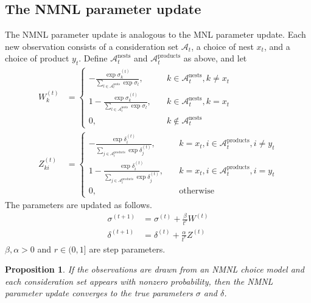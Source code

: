 \documentclass[preprint,12pt,authoryear]{elsarticle}
\newtheorem{proposition}{Proposition}
\begin{document}
\subsection{The NMNL parameter update}
The NMNL parameter update is analogous to the MNL parameter update. Each new observation consists of a consideration set $\mathcal{A}_t$, a choice of nest $x_t$, and a choice of product $y_t$. Define $\mathcal{A}_t^{\text{nests}}$ and $\mathcal{A}_{t}^{\text{products}}$ as above, and let
\begin{align}
W^{(t)}_k &= \begin{cases}
 -  \frac{\exp \sigma^{(t)}_k}{\sum_{l\in \mathcal{A}_{t}^{\text{nests}}} \exp \sigma_l}, \quad & k \in \mathcal{A}_{t}^{\text{nests}}, k \neq x_t\\
1 -  \frac{\exp \sigma^{(t)}_k}{\sum_{l\in \mathcal{A}_{t}^{\text{nests}}} \exp \sigma_l}, \quad & k \in \mathcal{A}_{t}^{\text{nests}}, k = x_t\\
0, \quad & k \notin \mathcal{A}_{t}^{\text{nests}}
\end{cases} \\
Z^{(t)}_{ki} &= 
\begin{cases}
 - \frac{\exp \delta^{(t)}_i}{\sum_{j\in \mathcal{A}_t^{\text{products}}} \exp \delta^{(t)}_j}, \quad&k = x_t, i \in \mathcal{A}_t^{\text{products}}, i\neq y_t \\
1 - \frac{\exp \delta^{(t)}_i}{\sum_{j\in \mathcal{A}_t^{\text{products}}} \exp \delta^{(t)}_j} , \quad&k = x_t, i \in \mathcal{A}_t^{\text{products}}, i =  y_t \\
0, \quad & \text{otherwise}
\end{cases}
\end{align}
The parameters are updated as follows.
\begin{align}\label{nmnlparameterupdate}
\sigma^{(t+1)} &= \sigma^{(t)} + \frac{\beta}{t^r} W^{(t)} \\
\delta^{(t+1)} &= \delta^{(t)} +  \frac{\alpha}{t^r} Z^{(t)} 
\end{align}
$\beta, \alpha >0$ and $r \in (0, 1]$ are step parameters.

\begin{proposition}If the observations are drawn from an NMNL choice model and each consideration set appears with nonzero probability, then the NMNL parameter update converges to the true parameters $\sigma$ and $\delta$.\end{proposition}
\end{document}
